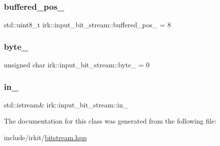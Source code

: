 \subsubsection{\texorpdfstring{buffered\+\_\+pos\+\_\+}{buffered\_pos\_}}
{\footnotesize\ttfamily std\+::uint8\+\_\+t irk\+::input\+\_\+bit\+\_\+stream\+::buffered\+\_\+pos\+\_\+ = 8\hspace{0.3cm}{\ttfamily [protected]}}

\mbox{\label{classirk_1_1input__bit__stream_a18d1743fba8de3f3ff758f991790f3d3}} 
\subsubsection{\texorpdfstring{byte\+\_\+}{byte\_}}
{\footnotesize\ttfamily unsigned char irk\+::input\+\_\+bit\+\_\+stream\+::byte\+\_\+ = 0\hspace{0.3cm}{\ttfamily [protected]}}

\mbox{\label{classirk_1_1input__bit__stream_a3513799a1ea6025e9e6fc2c83a530b6a}} 
\subsubsection{\texorpdfstring{in\+\_\+}{in\_}}
{\footnotesize\ttfamily std\+::istream\& irk\+::input\+\_\+bit\+\_\+stream\+::in\+\_\+\hspace{0.3cm}{\ttfamily [protected]}}



The documentation for this class was generated from the following file\+:\begin{DoxyCompactItemize}
\item 
include/irkit/\mbox{\hyperlink{bitstream_8hpp}{bitstream.\+hpp}}\end{DoxyCompactItemize}
